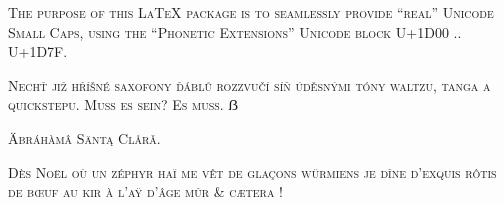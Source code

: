 \documentclass{scrartcl}
\begin{document}
\textsc{The purpose of this LaTeX package is to seamlessly provide “real” Unicode Small Caps, using the “Phonetic Extensions” Unicode block U+1D00 .. U+1D7F.}

\textsc{Nechť již hříšné saxofony ďáblů rozzvučí síň úděsnými tóny waltzu, tanga a quickstepu. Muß es sein? Es muss. ẞ}

\textsc{Äbráhàmâ Säntą Clårǎ.}

\textsc{Dès Noël où un zéphyr haï me vêt de glaçons würmiens je dîne d’exquis rôtis de bœuf au kir à l’aÿ d’âge mûr \& cætera !}

\vspace{3em}\par
{}
\end{document}
